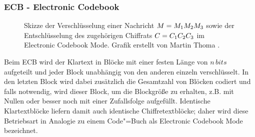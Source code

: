 \subsubsection{ECB - Electronic Codebook}
\begin{figure}[h]
\centering
{}
\hfill
{}
\caption{Skizze der Verschlüsselung einer Nachricht $M = M_1 M_2 M_3$ sowie der Entschlüsselung des zugehörigen Chiffrats $C = C_1 C_2 C_3$ im
Electronic Codebook Mode. Grafik erstellt von Martin Thoma \cite{martinthoma}.}
\end{figure}

Beim ECB wird der Klartext in Blöcke mit einer festen Länge von $n\,bits$ aufgeteilt und jeder Block unabhängig von den anderen einzeln verschlüsselt. In den
letzten Block wird dabei zusätzlich die Gesamtzahl von Blöcken codiert und falls notwendig, wird dieser Block, um die Blockgröße zu erhalten, z.B. mit Nullen
oder besser noch mit einer Zufallsfolge aufgefüllt. Identische Klartextblöcke liefern damit auch identische Chiffretextblöcke; daher wird diese Betriebsart in
Analogie zu einem Code"=Buch als Electronic Codebook Mode bezeichnet.


